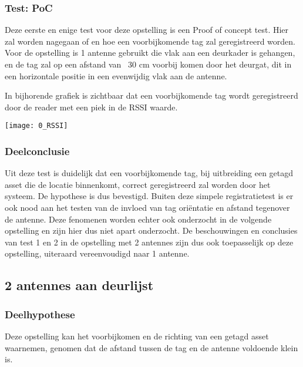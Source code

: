 \subsubsection{Test: PoC}
Deze eerste en enige test voor deze opstelling is een Proof of concept test. Hier zal worden nagegaan of en hoe een voorbijkomende tag zal geregistreerd worden. Voor de opstelling is 1 antenne gebruikt die vlak aan een deurkader is gehangen, en de tag zal op een afstand van ~30 cm voorbij komen door het deurgat, dit in een horizontale positie in een evenwijdig vlak aan de antenne.

\begin{minipage}{0.55\textwidth}
In bijhorende grafiek is zichtbaar dat een voorbijkomende tag wordt geregistreerd door de reader met een piek in de RSSI waarde.
\end{minipage}
\hfill
\begin{minipage}{0.42\textwidth}
	\texttt{[image: 0\_RSSI]}
	\label{fig:ond-rfid-static-0-res}
\end{minipage}

\subsubsection{Deelconclusie}
Uit deze test is duidelijk dat een voorbijkomende tag, bij uitbreiding een getagd asset die de locatie binnenkomt, correct geregistreerd zal worden door het systeem. De hypothese is dus bevestigd. Buiten deze simpele registratietest is er ook nood aan het testen van de invloed van tag oriëntatie en afstand tegenover de antenne. Deze fenomenen worden echter ook onderzocht in de volgende opstelling en zijn hier dus niet apart onderzocht. De beschouwingen en conclusies van test 1 en 2 in de opstelling met 2 antennes zijn dus ook toepasselijk op deze opstelling, uiteraard vereenvoudigd naar 1 antenne.

\subsection{2 antennes aan deurlijst}
\subsubsection{Deelhypothese}
Deze opstelling kan het voorbijkomen en de richting van een getagd asset waarnemen, genomen dat de afstand tussen de tag en de antenne voldoende klein is.

